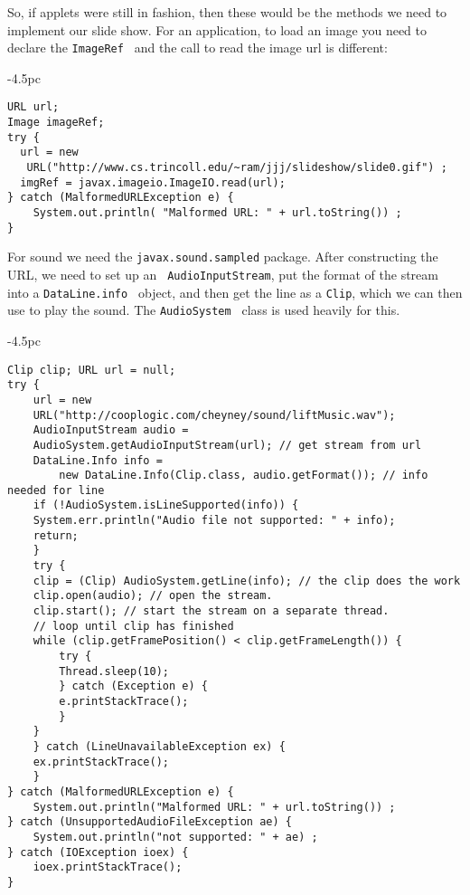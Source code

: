 \noindent So, if applets were still in fashion, then these would be the methods we need to
implement our slide show. For an application, to load an image you need to
declare the { \tt ImageRef } and the call to read the image url is different:

\begin{jjjlistingleft}[30.5pc]{-4.5pc}
\begin{lstlisting}
URL url;
Image imageRef; 
try {
  url = new 
   URL("http://www.cs.trincoll.edu/~ram/jjj/slideshow/slide0.gif") ;
  imgRef = javax.imageio.ImageIO.read(url);
} catch (MalformedURLException e) {
    System.out.println( "Malformed URL: " + url.toString()) ;
}
\end{lstlisting}
\end{jjjlistingleft}

\noindent For sound we need the {\tt javax.sound.sampled}
package. After constructing the URL, we need to set up an {\tt
  AudioInputStream}, put the format of the stream into a
{\tt DataLine.info } object, and then get the line as a {\tt Clip},
which we can then use to play the sound. The {\tt AudioSystem } class
is used heavily for this.

\begin{jjjlistingleft}[30.5pc]{-4.5pc}
\begin{lstlisting}
Clip clip; URL url = null;
try {
    url = new 
    URL("http://cooplogic.com/cheyney/sound/liftMusic.wav");
    AudioInputStream audio =
	AudioSystem.getAudioInputStream(url); // get stream from url
    DataLine.Info info = 
        new DataLine.Info(Clip.class, audio.getFormat()); // info needed for line
    if (!AudioSystem.isLineSupported(info)) {
	System.err.println("Audio file not supported: " + info);
	return;
    }
    try {
	clip = (Clip) AudioSystem.getLine(info); // the clip does the work
	clip.open(audio); // open the stream.
	clip.start(); // start the stream on a separate thread.
	// loop until clip has finished
	while (clip.getFramePosition() < clip.getFrameLength()) {
	    try {
		Thread.sleep(10);
	    } catch (Exception e) {
		e.printStackTrace();
	    }
	}
    } catch (LineUnavailableException ex) {
	ex.printStackTrace();
    }  
} catch (MalformedURLException e) {
    System.out.println("Malformed URL: " + url.toString()) ;
} catch (UnsupportedAudioFileException ae) {
    System.out.println("not supported: " + ae) ;
} catch (IOException ioex) {
    ioex.printStackTrace();
}
\end{lstlisting}
\end{jjjlistingleft}



